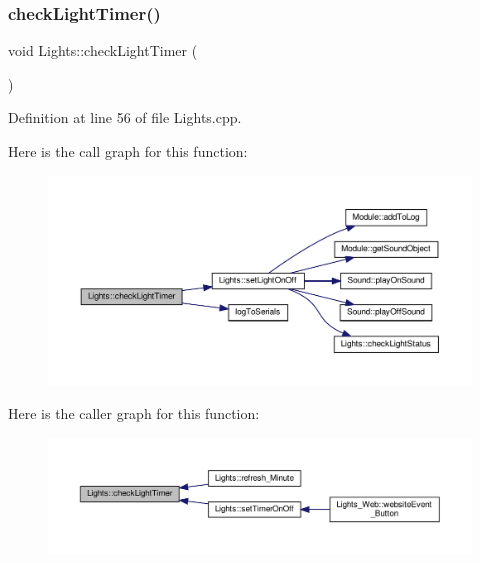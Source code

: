 \mbox{\label{class_lights_a291179d021dad8a22d3f27203fcaa819}} 
\subsubsection{\texorpdfstring{check\+Light\+Timer()}{checkLightTimer()}\hspace{0.1cm}{\footnotesize\ttfamily [1/2]}}
{\footnotesize\ttfamily void Lights\+::check\+Light\+Timer (\begin{DoxyParamCaption}{ }\end{DoxyParamCaption})\hspace{0.3cm}{\ttfamily [protected]}}



Definition at line 56 of file Lights.\+cpp.

Here is the call graph for this function\+:
\nopagebreak
\begin{figure}[H]
\begin{center}
\leavevmode
\includegraphics[width=350pt]{class_lights_a291179d021dad8a22d3f27203fcaa819_cgraph}
\end{center}
\end{figure}
Here is the caller graph for this function\+:
\nopagebreak
\begin{figure}[H]
\begin{center}
\leavevmode
\includegraphics[width=350pt]{class_lights_a291179d021dad8a22d3f27203fcaa819_icgraph}
\end{center}
\end{figure}
\mbox{\label{class_lights_a291179d021dad8a22d3f27203fcaa819}} 
